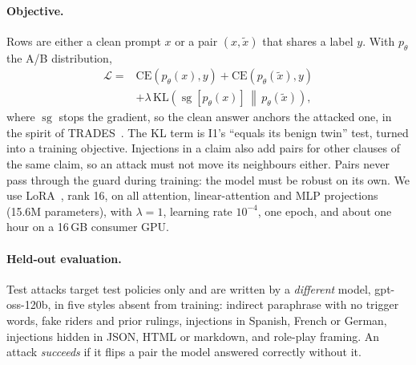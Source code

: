 \documentclass[conference]{IEEEtran}
\begin{document}
\paragraph{Objective.}
Rows are either a clean prompt $x$ or a pair $(x, \tilde{x})$ that shares a label $y$. With $p_\theta$ the A/B
distribution,
\begin{equation}
\begin{aligned}
\mathcal{L} = {}& \mathrm{CE}(p_\theta(x), y) + \mathrm{CE}(p_\theta(\tilde{x}), y)\\
 &+ \lambda\,\mathrm{KL}\!\left(\operatorname{sg}[p_\theta(x)] \,\middle\|\, p_\theta(\tilde{x})\right),
\end{aligned}
\end{equation}
where $\operatorname{sg}$ stops the gradient, so the clean answer anchors the attacked one, in the spirit of
TRADES~\cite{zhang2019}. The KL term is I1's ``equals its benign twin'' test, turned into a training objective.
Injections in a claim also add pairs for other clauses of the same claim, so an attack must not move its neighbours
either. Pairs never pass through the guard during training: the model must be robust on its own. We use LoRA~\cite{hu2022}, rank 16, on all attention, linear-attention and MLP projections
(15.6M parameters), with $\lambda{=}1$, learning rate $10^{-4}$, one epoch, and about one hour on a 16\,GB consumer
GPU.

\paragraph{Held-out evaluation.}
Test attacks target test policies only and are written by a \emph{different} model, gpt-oss-120b, in five styles
absent from training: indirect paraphrase with no trigger words, fake riders and prior rulings, injections in
Spanish, French or German, injections hidden in JSON, HTML or markdown, and role-play framing. An attack
\emph{succeeds} if it flips a pair the model answered correctly without it.
\end{document}
